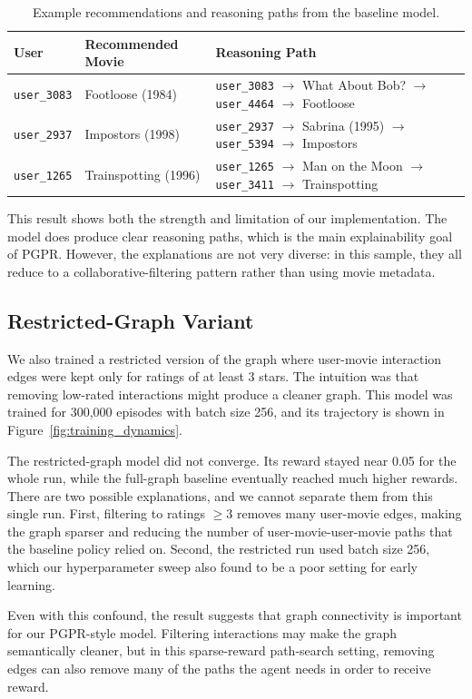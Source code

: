\documentclass{article}
\begin{document}
\begin{table}[H]
\centering
\caption{Example recommendations and reasoning paths from the baseline model.}
\label{tab:paths}
\begin{tabular}{lll}
\toprule
User & Recommended Movie & Reasoning Path \\
\midrule
\texttt{user\_3083} & Footloose (1984) &
\texttt{user\_3083} $\to$ What About Bob? $\to$ \texttt{user\_4464} $\to$ Footloose \\
\texttt{user\_2937} & Impostors (1998) &
\texttt{user\_2937} $\to$ Sabrina (1995) $\to$ \texttt{user\_5394} $\to$ Impostors \\
\texttt{user\_1265} & Trainspotting (1996) &
\texttt{user\_1265} $\to$ Man on the Moon $\to$ \texttt{user\_3411} $\to$ Trainspotting \\
\bottomrule
\end{tabular}
\end{table}

This result shows both the strength and limitation of our implementation. The model does produce clear reasoning paths, which is the main explainability goal of PGPR. However, the explanations are not very diverse: in this sample, they all reduce to a collaborative-filtering pattern rather than using movie metadata.

\subsection{Restricted-Graph Variant}

We also trained a restricted version of the graph where user-movie interaction edges were kept only for ratings of at least 3 stars. The intuition was that removing low-rated interactions might produce a cleaner graph. This model was trained for 300,000 episodes with batch size 256, and its trajectory is shown in Figure~\ref{fig:training_dynamics}.

The restricted-graph model did not converge. Its reward stayed near 0.05 for the whole run, while the full-graph baseline eventually reached much higher rewards. There are two possible explanations, and we cannot separate them from this single run. First, filtering to ratings $\geq 3$ removes many user-movie edges, making the graph sparser and reducing the number of user-movie-user-movie paths that the baseline policy relied on. Second, the restricted run used batch size 256, which our hyperparameter sweep also found to be a poor setting for early learning.

Even with this confound, the result suggests that graph connectivity is important for our PGPR-style model. Filtering interactions may make the graph semantically cleaner, but in this sparse-reward path-search setting, removing edges can also remove many of the paths the agent needs in order to receive reward.
\end{document}
